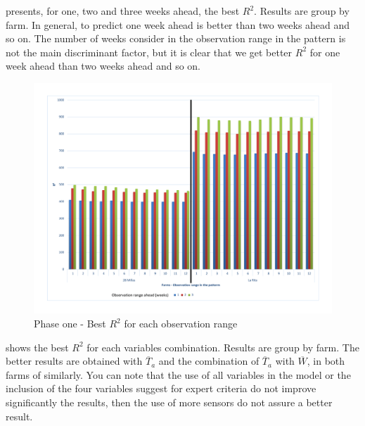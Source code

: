  presents, for one, two and three weeks ahead, the best $R^2$. Results are group by farm. In general, to predict one week ahead is better than two weeks ahead and so on. The number of weeks consider in the observation range in the pattern is not the main discriminant factor, but it is clear that we get better $R^2$ for one week ahead than two weeks ahead and so on.

\begin{figure}[H] 
 \centering
 \includegraphics[scale=.5]{2017-01-15-Periods-R2}
 \caption{Phase one - Best $R^2$ for each observation range} 
 \label{figura6} 
\end{figure}

 shows the best $R^2$ for each variables combination. Results are group by farm. The better results are obtained with $\overline{T}_{a}$ and the combination of $\overline{T}_{a}$ with $\overline{W}$, in both farms of similarly. You can note that the use of all variables in the model or the inclusion of the four variables suggest for expert criteria do not improve significantly the results, then the use of more sensors do not assure a better result. 

